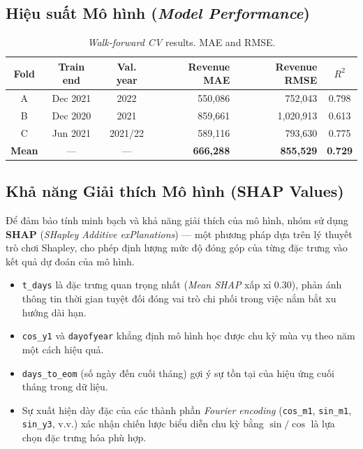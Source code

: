 \documentclass{article}
\begin{document}
\subsection{Hiệu suất Mô hình (\textit{Model Performance})}

\begin{table}[htbp]
\centering
\caption{\textit{Walk-forward CV} results. MAE and RMSE.}
\renewcommand{\arraystretch}{1.2} 
\begin{tabular}{@{} c c c r r c @{}}
\toprule
\textbf{Fold} & \textbf{Train end} & \textbf{Val. year} & \textbf{Revenue MAE} & \textbf{Revenue RMSE} & \textbf{$R^2$} \\
\midrule
A & Dec 2021 & 2022    & 550,086 & 752,043   & 0.798 \\
B & Dec 2020 & 2021    & 859,661 & 1,020,913 & 0.613 \\
C & Jun 2021 & 2021/22 & 589,116 & 793,630   & 0.775 \\
\midrule
\textbf{Mean} & --- & --- & \textbf{666,288} & \textbf{855,529} & \textbf{0.729} \\
\bottomrule
\end{tabular}
\end{table}

\FloatBarrier 

\subsection{Khả năng Giải thích Mô hình (\textbf{SHAP} Values)}

Để đảm bảo tính minh bạch và khả năng giải thích của mô hình, nhóm sử dụng \textbf{SHAP} (\textit{SHapley Additive exPlanations}) — một phương pháp dựa trên lý thuyết trò chơi Shapley, cho phép định lượng mức độ đóng góp của từng đặc trưng vào kết quả dự đoán của mô hình.

\begin{itemize}
    \item \texttt{t\_days} là đặc trưng quan trọng nhất (\textit{Mean SHAP} xấp xỉ 0.30), phản ánh thông tin thời gian tuyệt đối đóng vai trò chi phối trong việc nắm bắt xu hướng dài hạn.
    \item \texttt{cos\_y1} và \texttt{dayofyear} khẳng định mô hình học được chu kỳ mùa vụ theo năm một cách hiệu quả.
    \item \texttt{days\_to\_eom} (số ngày đến cuối tháng) gợi ý sự tồn tại của hiệu ứng cuối tháng trong dữ liệu.
    \item Sự xuất hiện dày đặc của các thành phần \textit{Fourier encoding} (\texttt{cos\_m1}, \texttt{sin\_m1}, \texttt{sin\_y3}, v.v.) xác nhận chiến lược biểu diễn chu kỳ bằng $\sin/\cos$ là lựa chọn đặc trưng hóa phù hợp.
\end{itemize}
\end{document}
